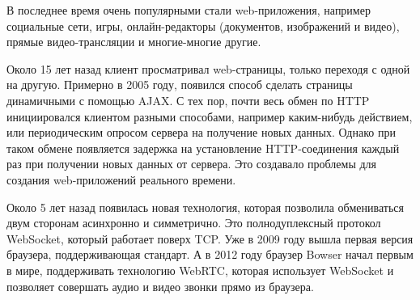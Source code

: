 \intro
В последнее время очень популярными стали web-приложения, например социальные сети, игры, онлайн-редакторы (документов, изображений и видео), прямые видео-трансляции и многие-многие другие.

Около 15 лет назад клиент просматривал web-страницы, только переходя с одной на другую. Примерно в 2005 году, появился способ сделать страницы динамичными с помощью AJAX. С тех пор, почти весь обмен по HTTP инициировался клиентом разными способами, например каким-нибудь действием, или периодическим опросом сервера на получение новых данных. Однако при таком обмене появляется задержка на установление HTTP-соединения каждый раз при получении новых данных от сервера. Это создавало проблемы для создания web-приложений реального времени.\cite{ajax_problem}

Около 5 лет назад появилась новая технология, которая позволила обмениваться двум сторонам асинхронно и симметрично. Это полнодуплексный протокол WebSocket, который работает поверх TCP. Уже в 2009 году вышла первая версия браузера, поддерживающая стандарт.\cite{web_socket_begining} А в 2012 году браузер Bowser начал первым в мире, поддерживать технологию WebRTC, которая использует WebSocket и позволяет совершать аудио и видео звонки прямо из браузера.\cite{bowser}
